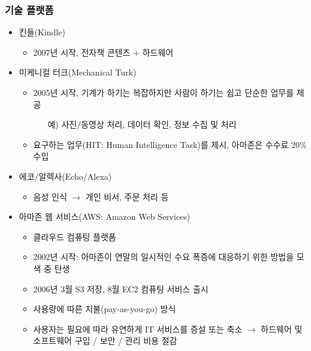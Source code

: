\subsubsection{기술 플랫폼}
\begin{itemize}
\item 킨들(Kindle)
	\begin{itemize}
	\item 2007년 시작, 전자책 콘텐츠 $+$ 하드웨어
	\end{itemize}
\item 미케니컬 터크(Mechanical Turk)
	\begin{itemize}
	\item 2005년 시작, 기계가 하기는 복잡하지만 사람이 하기는 쉽고 단순한 업무를 제공
		\begin{itemize}
		\item[예)] 사진/동영상 처리, 데이터 확인, 정보 수집 및 처리
		\end{itemize}
	\item 요구하는 업무(HIT: Human Intelligence Task)를 제시, 아마존은 수수료 20\% 수입
	\end{itemize}
\item 에코/알렉사(Echo/Alexa)
	\begin{itemize}
	\item 음성 인식 $\rightarrow$ 개인 비서, 주문 처리 등
	\end{itemize}
\item 아마존 웹 서비스(AWS: Amazon Web Services)
	\begin{itemize}
	\item 클라우드 컴퓨팅 플랫폼
	\item 2002년 시작: 아마존이 연말의 일시적인 수요 폭증에 대응하기 위한 방법을 모색 중 탄생
	\item 2006년 3월 S3 저장, 8월 EC2 컴퓨팅 서비스 출시 
	\item 사용량에 따른 지불(pay-as-you-go) 방식
	\item 사용자는 필요에 따라 유연하게 IT 서비스를 증설 또는 축소 $\rightarrow$ 하드웨어 및 소프트웨어 구입 / 보안 / 관리 비용 절감
	\end{itemize}
\end{itemize}


